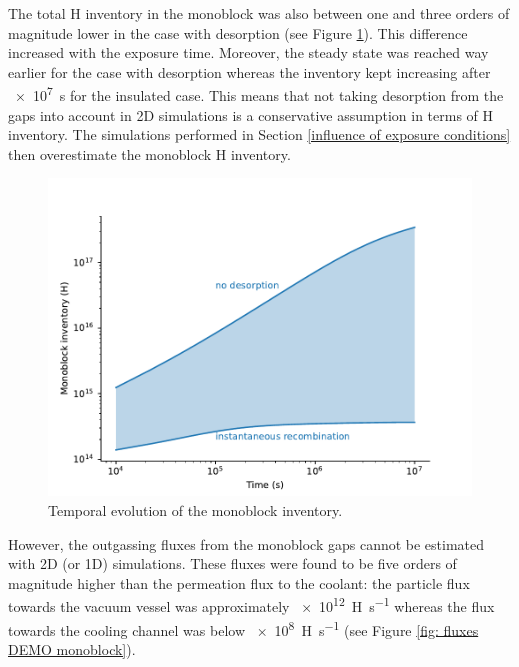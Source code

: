 The total H inventory in the monoblock was also between one and three orders of magnitude lower in the case with desorption (see Figure \ref{fig: inventory vs time DEMO monoblock}).
This difference increased with the exposure time.
Moreover, the steady state was reached way earlier for the case with desorption whereas the inventory kept increasing after \SI{e7}{s} for the insulated case.
This means that not taking desorption from the gaps into account in 2D simulations is a conservative assumption in terms of H inventory.
The simulations performed in Section \ref{influence of exposure conditions} then overestimate the monoblock H inventory.

\begin{figure}
    \centering
    \includegraphics[width=\linewidth]{Figures/Chapter3/monoblocks/3D_monoblocks/inventory.pdf}
    \caption{Temporal evolution of the monoblock inventory.}
    \label{fig: inventory vs time DEMO monoblock}
\end{figure}

However, the outgassing fluxes from the monoblock gaps cannot be estimated with 2D (or 1D) simulations.
These fluxes were found to be five orders of magnitude higher than the permeation flux to the coolant: the particle flux towards the vacuum vessel was approximately \SI{e12}{H.s^{-1}} whereas the flux towards the cooling channel was below \SI{e8}{H.s^{-1}} (see Figure \ref{fig: fluxes DEMO monoblock}).

